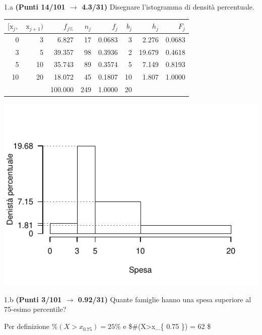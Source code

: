 \documentclass[
  11pt,
]{book}
\theoremstyle{mytheoremstyle}
\theoremstyle{mydefstyle}
\newenvironment{sol}
  {
  \begin{tcolorbox}[enhanced,breakable,arc=0.1mm,boxrule=1pt,colback=white,colframe=iblue,
  title=\bf \fontfamily{lmss}\selectfont \hspace{.5 cm} Soluzione,drop fuzzy shadow]

}{
\end{tcolorbox}
  }
\begin{document}
1.a \textbf{(Punti 14/101 \(\rightarrow\) 4.3/31)} Disegnare l'istogramma di densità percentuale.

\begin{sol}

\begin{table}[H]
\centering
\begin{tabular}{rrrrrrrr}
\toprule
$[\text{x}_j,$ & $\text{x}_{j+1})$ & $f_{j\%}$ & $n_j$ & $f_j$ & $b_j$ & $h_j$ & $F_j$\\
\midrule
0 & 3 & 6.827 & 17 & 0.0683 & 3 & 2.276 & 0.0683\\
3 & 5 & 39.357 & 98 & 0.3936 & 2 & 19.679 & 0.4618\\
5 & 10 & 35.743 & 89 & 0.3574 & 5 & 7.149 & 0.8193\\
10 & 20 & 18.072 & 45 & 0.1807 & 10 & 1.807 & 1.0000\\
 &  & 100.000 & 249 & 1.0000 & 20 &  & \\
\bottomrule
\end{tabular}
\end{table}

\begin{center}\includegraphics{Esami_passati_con_soluzioni_files/figure-latex/2022-7-1} \end{center}

\end{sol}

1.b \textbf{(Punti 3/101 \(\rightarrow\) 0.92/31)} Quante famiglie hanno una spesa superiore al 75-esimo percentile?

\begin{sol}
Per definizione \(\%(X>x_{ 0.75 })= 25 \%\) e
\$\#(X\textgreater x\_\{ 0.75 \})  = 62 \$

\end{sol}
\end{document}
